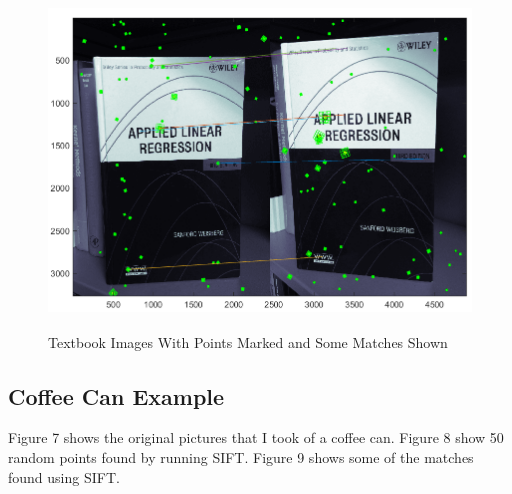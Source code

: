 \documentclass[11pt,psfig]{article}
\begin{document}
\begin{figure}[H]
\centering
\includegraphics[height=3.5in]{book_pointsWithMatching.png}
\caption{Textbook Images With Points Marked and Some Matches Shown}
\label{bk3}
\end{figure}

\newpage

\subsection*{Coffee Can Example}

Figure 7 shows the original pictures that I took of a coffee can. Figure 8 show 50 random points found by running SIFT. Figure 9 shows some of the matches found using SIFT. 
\end{document}
